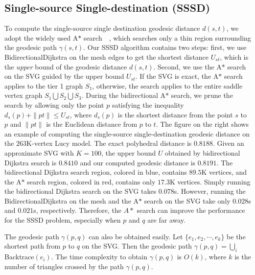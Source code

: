 \subsection{Single-source Single-destination (SSSD)}
\label{subsec:sssd}

 To compute the single-source single destination geodesic distance
$d(s,t)$, we adopt the widely used A$*$
search~\cite{astar}~\cite{Surazhsky_Etc:2005}, which searches only a
thin region surrounding the geodesic path $\gamma(s,t)$. Our SSSD
algorithm contains two steps: first, we use BidirectionalDijkstra on
the mesh edges to get the shortest distance $U_{st}$, which is the
\textit{upper} bound of the geodesic distance $d(s,t)$. Second, we
use the A$*$ search on the SVG guided by the upper bound $U_{st}$.
If the SVG is exact, the A$*$ search applies to the tier 1 graph
$S_1$, otherwise, the search applies to the entire saddle vertex
graph $S_1\bigcup S_2 \bigcup S_3$. During the bidirectional A$*$
search, we prune the search by allowing only the point $p$
satisfying the inequality $d_s(p)+\|pt\|\leq U_{st}$, where $d_s(p)$
is the shortest distance from the point $s$ to $p$ and $\|pt\|$ is
the Euclidean distance from $p$ to $t$. The figure on the right
shows an example of computing the single-source single-destination
geodesic distance on the $263$K-vertex Lucy model. The exact
polyhedral distance is $0.8188$. Given an approximate SVG with
$K=100$, the upper bound $U$ obtained by bidirectional Dijkstra
search is $0.8410$ and our computed geodesic distance is $0.8191$.
The bidirectional Dijkstra search region, colored in blue, contains
$89.5$K vertices, and the A$*$ search region, colored in red,
contains only $17.3$K vertices. Simply running the bidirectional
Dijkstra search on the SVG takes $0.078$s. However, running the
BidirectionalDijkstra on the mesh and the A$*$ search on the SVG
take only $0.028$s and $0.021$s, respectively. Therefore, the $A*$
search can improve the performance for the SSSD problem, especially
when $p$ and $q$ are far away.

The geodesic path $\gamma(p,q)$ can also be obtained easily. Let
$\{e_1,e_2,\cdots,e_k\}$ be the shortest path from $p$ to $q$ on the
SVG. Then the geodesic path $\gamma(p,q)=\bigcup_i$Backtrace$(e_i)$.
The time complexity to obtain $\gamma(p,q)$ is $O(k)$, where $k$ is
the number of triangles crossed by the path $\gamma(p,q)$.


